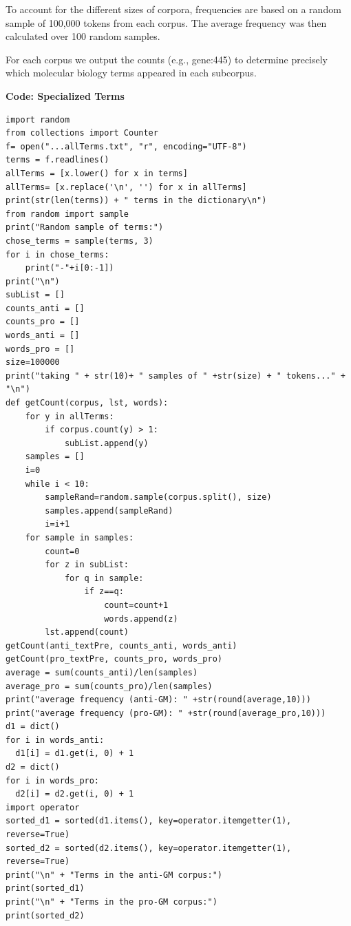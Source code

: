 To account for the different sizes of corpora, frequencies are based on a random sample of 100,000 tokens from each corpus. The average frequency was then calculated over 100 random samples.

For each corpus we output the counts (e.g., {gene:445}) to determine precisely which molecular biology terms appeared in each subcorpus. 

\textbf{Code: Specialized Terms}

\begin{lstlisting}
import random
from collections import Counter
f= open("...allTerms.txt", "r", encoding="UTF-8")
terms = f.readlines()
allTerms = [x.lower() for x in terms]
allTerms= [x.replace('\n', '') for x in allTerms]
print(str(len(terms)) + " terms in the dictionary\n") 
from random import sample
print("Random sample of terms:")
chose_terms = sample(terms, 3)
for i in chose_terms:
    print("-"+i[0:-1])
print("\n")
subList = []
counts_anti = []
counts_pro = []
words_anti = []
words_pro = []
size=100000
print("taking " + str(10)+ " samples of " +str(size) + " tokens..." + "\n")
def getCount(corpus, lst, words):
    for y in allTerms:
        if corpus.count(y) > 1:
            subList.append(y)
    samples = []
    i=0
    while i < 10:
        sampleRand=random.sample(corpus.split(), size)
        samples.append(sampleRand)
        i=i+1
    for sample in samples:
        count=0
        for z in subList:
            for q in sample:
                if z==q:
                    count=count+1
                    words.append(z)
        lst.append(count)
getCount(anti_textPre, counts_anti, words_anti)    
getCount(pro_textPre, counts_pro, words_pro)    
average = sum(counts_anti)/len(samples)
average_pro = sum(counts_pro)/len(samples)
print("average frequency (anti-GM): " +str(round(average,10)))
print("average frequency (pro-GM): " +str(round(average_pro,10)))
d1 = dict()
for i in words_anti:
  d1[i] = d1.get(i, 0) + 1
d2 = dict()
for i in words_pro:
  d2[i] = d2.get(i, 0) + 1
import operator
sorted_d1 = sorted(d1.items(), key=operator.itemgetter(1), reverse=True)
sorted_d2 = sorted(d2.items(), key=operator.itemgetter(1), reverse=True)
print("\n" + "Terms in the anti-GM corpus:")
print(sorted_d1)
print("\n" + "Terms in the pro-GM corpus:")
print(sorted_d2)
\end{lstlisting}

